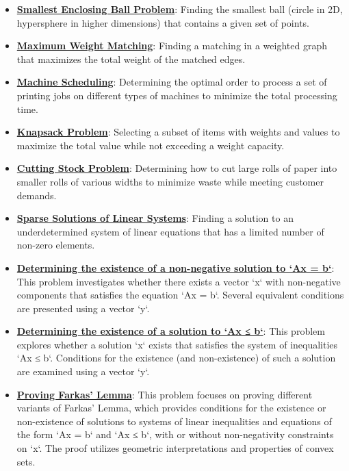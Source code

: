 \documentclass{article}%
\begin{document}
\begin{itemize}[leftmargin=*]
\item \href{https://www.math.purdue.edu/~yipn/421/2024-10-28-ApplsLinProg.pdf#page=17}{\textbf{Smallest Enclosing Ball Problem}}: Finding the smallest ball (circle in 2D, hypersphere in higher dimensions) that contains a given set of points. %
\item \href{https://www.math.purdue.edu/~yipn/421/2024-10-28-ApplsLinProg.pdf#page=19}{\textbf{Maximum Weight Matching}}: Finding a matching in a weighted graph that maximizes the total weight of the matched edges. %
\item \href{https://www.math.purdue.edu/~yipn/421/2024-10-28-ApplsLinProg.pdf#page=22}{\textbf{Machine Scheduling}}: Determining the optimal order to process a set of printing jobs on different types of machines to minimize the total processing time. %
\item \href{https://www.math.purdue.edu/~yipn/421/2024-10-28-ApplsLinProg.pdf#page=24}{\textbf{Knapsack Problem}}: Selecting a subset of items with weights and values to maximize the total value while not exceeding a weight capacity. %
\item \href{https://www.math.purdue.edu/~yipn/421/2024-10-28-ApplsLinProg.pdf#page=25}{\textbf{Cutting Stock Problem}}: Determining how to cut large rolls of paper into smaller rolls of various widths to minimize waste while meeting customer demands. %
\item \href{https://www.math.purdue.edu/~yipn/421/2024-10-28-ApplsLinProg.pdf#page=30}{\textbf{Sparse Solutions of Linear Systems}}: Finding a solution to an underdetermined system of linear equations that has a limited number of non-zero elements. %
\item \href{https://www.math.purdue.edu/~yipn/421/2024-10-28-Farkas.pdf#page=2}{\textbf{Determining the existence of a non{-}negative solution to `Ax = b`}}: This problem investigates whether there exists a vector `x` with non-negative components that satisfies the equation `Ax = b`. Several equivalent conditions are presented using a vector `y`. %
\item \href{https://www.math.purdue.edu/~yipn/421/2024-10-28-Farkas.pdf#page=4}{\textbf{Determining the existence of a solution to `Ax ≤ b`}}: This problem explores whether a solution `x` exists that satisfies the system of inequalities `Ax ≤ b`. Conditions for the existence (and non-existence) of such a solution are examined using a vector `y`. %
\item \href{https://www.math.purdue.edu/~yipn/421/2024-10-28-Farkas.pdf#page=1}{\textbf{Proving Farkas' Lemma}}: This problem focuses on proving different variants of Farkas' Lemma, which provides conditions for the existence or non-existence of solutions to systems of linear inequalities and equations of the form `Ax = b` and `Ax ≤ b`, with or without non-negativity constraints on `x`. The proof utilizes geometric interpretations and properties of convex sets. %

\end{itemize}
\end{document}
